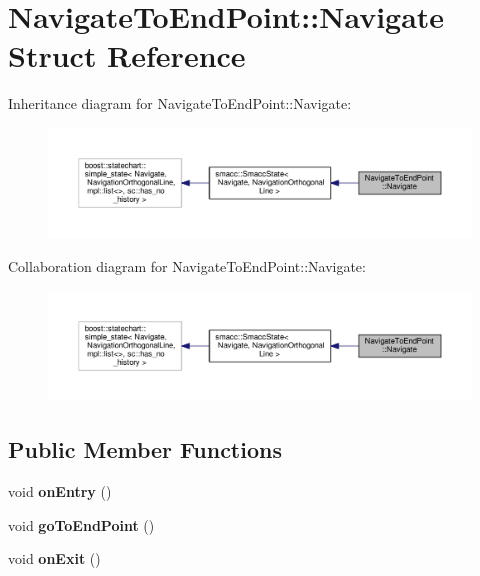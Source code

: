 \hypertarget{structNavigateToEndPoint_1_1Navigate}{\section{Navigate\-To\-End\-Point\-:\-:Navigate Struct Reference}
\label{structNavigateToEndPoint_1_1Navigate}
}


Inheritance diagram for Navigate\-To\-End\-Point\-:\-:Navigate\-:
\nopagebreak
\begin{figure}[H]
\begin{center}
\leavevmode
\includegraphics[width=350pt]{structNavigateToEndPoint_1_1Navigate__inherit__graph}
\end{center}
\end{figure}


Collaboration diagram for Navigate\-To\-End\-Point\-:\-:Navigate\-:
\nopagebreak
\begin{figure}[H]
\begin{center}
\leavevmode
\includegraphics[width=350pt]{structNavigateToEndPoint_1_1Navigate__coll__graph}
\end{center}
\end{figure}
\subsection*{Public Member Functions}
\begin{DoxyCompactItemize}
\item 
\hypertarget{structNavigateToEndPoint_1_1Navigate_a97b145eda2187b8256956199c326180e}{void {\bfseries on\-Entry} ()}\label{structNavigateToEndPoint_1_1Navigate_a97b145eda2187b8256956199c326180e}

\item 
\hypertarget{structNavigateToEndPoint_1_1Navigate_a67813e26712c2ddddb4d21a6e0bb6e5d}{void {\bfseries go\-To\-End\-Point} ()}\label{structNavigateToEndPoint_1_1Navigate_a67813e26712c2ddddb4d21a6e0bb6e5d}

\item 
\hypertarget{structNavigateToEndPoint_1_1Navigate_a3088d59f79aaa269afcdbe2e0f346a64}{void {\bfseries on\-Exit} ()}\label{structNavigateToEndPoint_1_1Navigate_a3088d59f79aaa269afcdbe2e0f346a64}

\end{DoxyCompactItemize}
